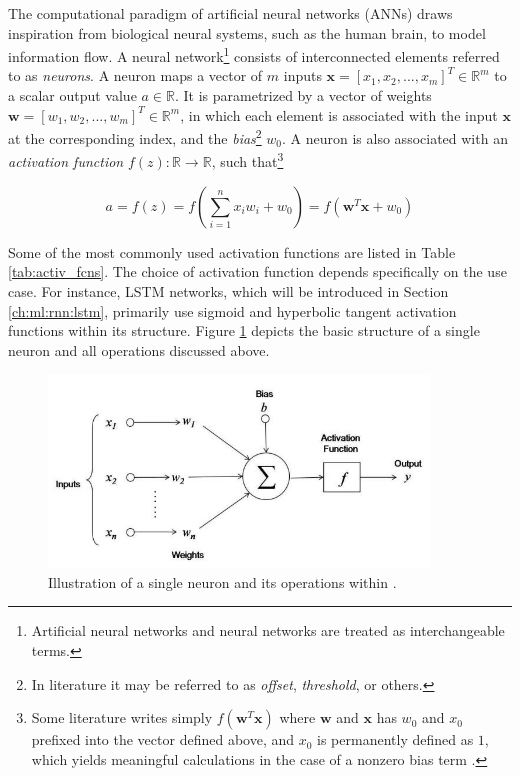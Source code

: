 The computational paradigm of artificial neural networks (ANNs) draws inspiration from biological neural systems, such as the human brain, to model information flow. A neural network\footnote{Artificial neural networks and neural networks are treated as interchangeable terms.} consists of interconnected elements referred to as \emph{neurons}. A neuron maps a vector of $m$ inputs $\mathbf{x}=\left[x_1, x_2, ..., x_m\right]^T \in \mathbb{R}^{m}$ to a scalar output value $a\in \mathbb{R}$. It is parametrized by a vector of weights $\mathbf{w}=\left[w_1, w_2, ..., w_m\right]^T \in \mathbb{R}^{m}$, in which each element is associated with the input $\mathbf{x}$ at the corresponding index, and the \emph{bias}\footnote{In literature it may be referred to as \emph{offset}, \emph{threshold}, or others.} $w_0$. A neuron is also associated with an \emph{activation function} $f(z): \mathbb{R} \rightarrow \mathbb{R}$, such that\footnote{Some literature writes simply $f\left(\mathbf{w}^T\mathbf{x}\right)$ where  $\mathbf{w}$ and $\mathbf{x}$ has $w_0$ and $x_0$ prefixed into the vector defined above, and $x_0$ is permanently defined as $1$, which yields meaningful calculations in the case of a nonzero bias term \cite{mackay_nn}.}

\begin{equation}
    \label{eqn:activ_fcn}
    a = f(z) = f\left( \sum_{i=1}^n x_i w_i + w_0\right) = f\left(\mathbf{w}^T\mathbf{x} + w_0\right) 
\end{equation}

Some of the most commonly used activation functions are listed in Table \ref{tab:activ_fcns}. The choice of activation function depends specifically on the use case. For instance, LSTM networks, which will be introduced in Section \ref{ch:ml:rnn:lstm}, primarily use sigmoid and hyperbolic tangent activation functions within its structure. Figure \ref{fig:neuron} depicts the basic structure of a single neuron and all operations discussed above. 

\begin{figure}
    \centering
    \includegraphics[width=0.9\textwidth]{figures/neuron.jpeg}
    \caption{Illustration of a single neuron and its operations within \cite{neuron}.}
    \label{fig:neuron}
\end{figure}

